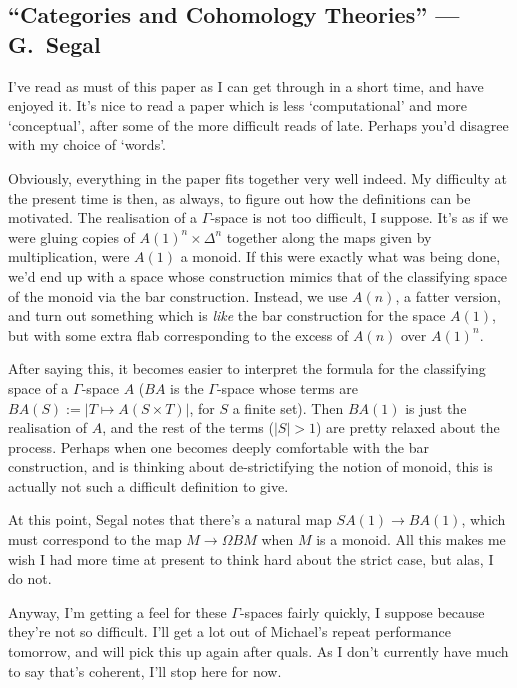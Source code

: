 \documentclass[11pt]{article}
\newcommand{\KanSemResponse}[1]
{
\thispagestyle{fancy}
\subsection*{#1}
}
\begin{document}
\begin{SegalCategoriesAndCohomologyTheories}
\KanSemResponse
{``Categories and Cohomology Theories'' --- G.\ Segal}
I've read as must of this paper as I can get through in a short time, and have enjoyed it. It's nice to read a paper which is less `computational' and more `conceptual', after some of the more difficult reads of late. Perhaps you'd disagree with my choice of `words'.

Obviously, everything in the paper fits together very well indeed. My difficulty at the present time is then, as always, to figure out how the definitions can be motivated. The realisation of a $\Gamma$-space is not too difficult, I suppose. It's as if we were gluing copies of $A(1)^n\times \Delta^n$ together along the maps given by multiplication, were $A(1)$ a monoid. If this were exactly what was being done, we'd end up with a space whose construction mimics that of the classifying space of the monoid via the bar construction. Instead, we use $A(n)$, a fatter version, and turn out something which is \emph{like} the bar construction for the space $A(1)$, but with some extra flab corresponding to the excess of $A(n)$ over $A(1)^n$.

After saying this, it becomes easier to interpret the formula for the classifying space of a $\Gamma$-space $A$ ($BA$ is the $\Gamma$-space whose terms are $BA(S):=|T\mapsto A(S\times T)|$, for $S$ a finite set). Then $BA(1)$ is just the realisation of $A$, and the rest of the terms ($|S|>1$) are pretty relaxed about the process. Perhaps when one becomes deeply comfortable with the bar construction, and is thinking about de-strictifying the notion of monoid, this is actually not such a difficult definition to give.

At this point, Segal notes that there's a natural map $SA(1)\to BA(1)$, which must correspond to the map $M\to\Omega BM$ when $M$ is a monoid. All this makes me wish I had more time at present to think hard about the strict case, but alas, I do not.

Anyway, I'm getting a feel for these $\Gamma$-spaces fairly quickly, I suppose because they're not so difficult. I'll get a lot out of Michael's repeat performance tomorrow, and will pick this up again after quals. As I don't currently have much to say that's coherent, I'll stop here for now.



\pagebreak
\end{SegalCategoriesAndCohomologyTheories}
\end{document}
